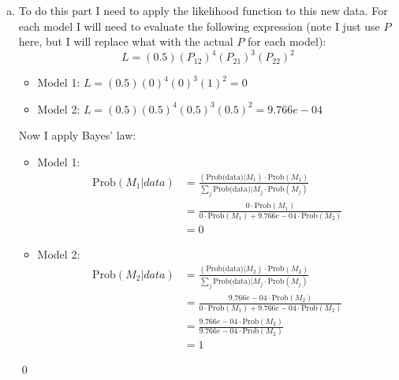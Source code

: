 \documentclass{homework}
\begin{document}
\begin{homeworkProblem}[Problem 2.3]
{\begin{enumerate}[a.]
          \item To do this part I need to apply the likelihood function to this new data. For each model I will need to evaluate the following expression (note I just use $P$ here, but I will replace what with the actual $P$ for each model): $$ L = (0.5) \left( P_{12} \right)^4 \left( P_{21} \right)^3 \left( P_{22} \right)^2$$

            \begin{itemize}
              \item Model 1: $L = (0.5) (0)^4 (0)^3 (1)^2  = 0$
              \item Model 2: $L = (0.5) (0.5)^4 (0.5)^3 (0.5)^2  = 9.766 e-04$
            \end{itemize}

          Now I apply Bayes' law:

          \begin{itemize}
              \item Model 1:
                \begin{align*}
                  \text{Prob}(M_1|data) &= \frac{\left( \text{Prob(data)}|M_1\right) \cdot \text{Prob}(M_1)}{\sum_j \text{Prob(data)}|M_j \cdot \text{Prob}(M_j)} \\
                    &= \frac{0 \cdot \text{Prob}(M_1)}{0 \cdot \text{Prob}(M_1) + 9.766 e-04 \cdot \text{Prob}(M_2)} \\
                    &= 0
                \end{align*}
                \item Model 2:
                \begin{align*}
                  \text{Prob}(M_2|data) &= \frac{\left( \text{Prob(data)}|M_2\right) \cdot \text{Prob}(M_2)}{\sum_j \text{Prob(data)}|M_j \cdot \text{Prob}(M_j)} \\
                    &= \frac{9.766 e-04 \cdot \text{Prob}(M_2)}{0 \cdot \text{Prob}(M_1) + 9.766 e-04 \cdot \text{Prob}(M_2)} \\
                    &= \frac{9.766 e-04 \cdot \text{Prob}(M_2)}{ 9.766 e-04 \cdot \text{Prob}(M_2)}  \\
                    &= 1
                \end{align*}
            \end{itemize} \qed

      \end{enumerate}

      

  }
\end{homeworkProblem}
\end{document}

